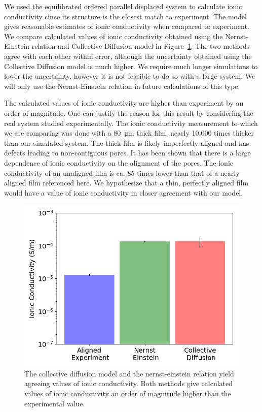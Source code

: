 \documentclass[journal=jpcbfk,manusciprt=article]{achemso}
\begin{document}
  We used the equilibrated ordered parallel displaced system to calculate ionic
  conductivity since its structure is the closest match to experiment. The model
  gives reasonable estimates of ionic conductivity when compared to experiment.
  We compare calculated values of ionic conductivity obtained using the
  Nernst-Einstein relation and Collective Diffusion model in
  Figure~\ref{fig:conductivity}. The two methods agree with each other within
  error, although the uncertainty obtained using the Collective Diffusion model
  is much higher. We require much longer simulations to lower the uncertainty,
  however it is not feasible to do so with a large system. We will only use the
  Nernst-Einstein relation in future calculations of this type. 

  The calculated values of ionic conductivity are higher than experiment by an
  order of magnitude. One can justify the reason for this result by considering
  the real system studied experimentally. The ionic conductivity measurement to
  which we are comparing was done with a \SI{80}{\micro\metre} thick film, nearly
  10,000 times thicker than our simulated system. The thick film is likely
  imperfectly aligned and has defects leading to non-contiguous pores. It has
  been shown that there is a large dependence of ionic conductivity on the
  alignment of the pores. The ionic conductivity of an unaligned film is ca. 85
  times lower than that of a nearly aligned film referenced here. We hypothesize
  that a thin, perfectly aligned film would have a value of ionic conductivity in
  closer agreement with our model.
 
  \begin{figure}
        \centering
        \includegraphics[width=0.5\linewidth]{IC_offset.png}
        \caption{The collective diffusion model and the nernst-einstein relation yield
        agreeing values of ionic conductivity. Both methods give calculated
        values of ionic conductivity an order of magnitude higher than the experimental
        value.}
        \label{fig:conductivity}
  \end{figure}
\end{document}
